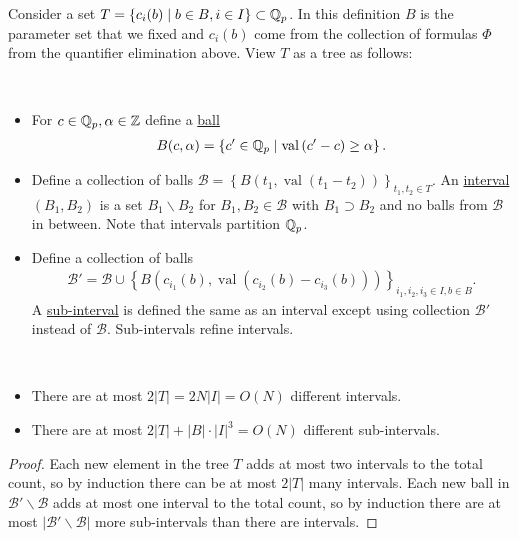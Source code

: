 \documentclass{amsart}
\newcommand{\BB}{\mathscr B}
\newcommand{\curly}[1]{\left\{#1\right\}}
\newcommand{\paren}[1]{\left(#1\right)}
\DeclareMathOperator{\vval}{val}
\newcommand{\defn}{\underline}
\begin{document}
Consider a set $T = \curly{c_i(b) \mid b \in B, i \in I} \subset \Q_p$.
In this definition $B$ is the parameter set that we fixed 
and $c_i(b)$ come from the collection of formulas $\Phi$ from the quantifier elimination above.
View $T$ as a tree as follows:
\begin{Definition} \ 
  \begin{itemize}
  \item For $c \in \mathbb{Q}_p, \alpha \in \mathbb{Z}$  define a \defn{ball} 
    \begin{align*}
      B(c, \alpha) = \curly{c' \in \Q_p \mid \vval \paren{c' - c} \geq \alpha}.  
    \end{align*}
  \item Define a collection of balls $\BB = \curly{B(t_1, \vval(t_1 - t_2))}_{t_1, t_2 \in T}$.
    An \defn{interval} $(B_1, B_2)$ is a set $B_1 \backslash B_2$
    for $B_1, B_2 \in \BB$ with $B_1 \supset B_2$ and no balls from $\BB$ in between.
    Note that intervals partition $\mathbb{Q}_p$.
  \item Define a collection of balls 
    \begin{align*}
      \BB' = \BB \cup \curly{B(c_{i_1}(b), \vval(c_{i_2}(b) - c_{i_3}(b)))}_{i_1, i_2, i_3 \in I, b\in B}.  
    \end{align*}
    A \defn{sub-interval} is defined the same as an interval except using collection $\BB'$ instead of $\BB$.
    Sub-intervals refine intervals.
  \end{itemize}
\end{Definition}

\begin{Lemma} \label{interval_count}\ 
  \begin{itemize}
  \item 
    There are at most $2|T| = 2 N |I| = O(N)$ different intervals.
  \item 
    There are at most $2|T| + |B| \cdot |I|^3 = O(N)$ different sub-intervals.
  \end{itemize}
\end{Lemma}

\begin{proof}
  Each new element in the tree $T$ adds at most two intervals to the total count,
  so by induction there can be at most $2|T|$ many intervals.
  Each new ball in $\BB' \backslash \BB$ adds at most one interval to the total count,
  so by induction there are at most $|\BB' \backslash \BB|$ more sub-intervals than there are intervals.
\end{proof}
\end{document}
